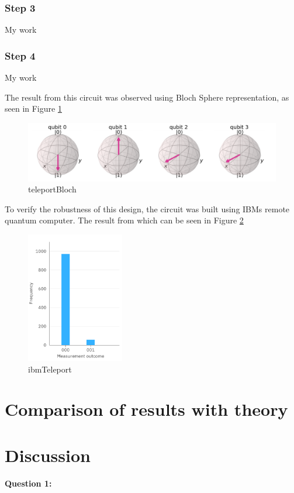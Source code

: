 \subsubsection{Step 3}
My work

\subsubsection{Step 4}
My work

The result from this circuit was observed using Bloch Sphere representation, as seen in Figure \ref{fig:teleportBloch}
\begin{figure}[h]
    \centering
    \includegraphics[width=\textwidth]{lab3/images/teleportBloch.png}
    \caption{teleportBloch}
    \label{fig:teleportBloch}
\end{figure}

To verify the robustness of this design, the circuit was built using IBMs remote quantum computer. The result from which can be seen in Figure \ref{fig:ibmTeleport}
\begin{figure}[h]
    \centering
    \includegraphics[width=0.38\textwidth]{lab3/images/ibmTeleport.png}
    \caption{ibmTeleport}
    \label{fig:ibmTeleport}
\end{figure}

\section{Comparison of results with theory}
\section{Discussion}
\textbf{Question 1:}

